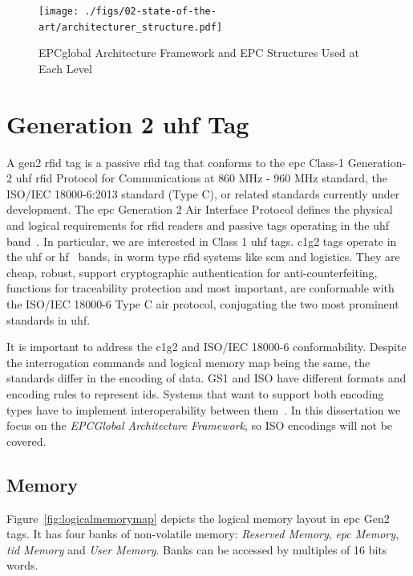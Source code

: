 \begin{figure}[!ht]
    \centering
    \texttt{[image: ./figs/02-state-of-the-art/architecturer\_structure.pdf]}
    \caption{EPCglobal Architecture Framework and EPC Structures Used at Each Level~\cite{GS1EPCTDS}} 
    \label{fig:archstructure}
\end{figure}

\section{Generation 2 \ac{uhf} Tag}

A \ac{gen2} \ac{rfid} tag is a passive \ac{rfid} tag that conforms to the \ac{epc} Class-1 Generation-2 \ac{uhf} \ac{rfid} Protocol for Communications at $860$ MHz - $960$ MHz standard, the ISO/IEC 18000-6:2013 standard (Type C), or related standards currently under development.
The \ac{epc} Generation 2 Air Interface Protocol defines the physical and logical requirements for \ac{rfid} readers and passive tags operating in the \ac{uhf} band~\cite{Gs1epcgen2v2uhfairinterfaceI2120180904}.
In particular, we are interested in Class 1 \ac{uhf} tags. \ac{c1g2} tags operate in the \ac{uhf} or \ac{hf}~\cite{EpcglobalHf3standard20110905r3} bands, in \ac{worm} type \ac{rfid} systems like \ac{scm} and logistics.
They are cheap, robust, support cryptographic authentication for anti-counterfeiting, functions for traceability protection and most important, are conformable with the ISO/IEC 18000-6 Type C air protocol, conjugating the two most prominent standards in \ac{uhf}.

It is important to address the \ac{c1g2} and ISO/IEC 18000-6 conformability. Despite the interrogation commands and logical memory map being the same, the standards differ in the encoding of data. 
GS1 and ISO have different formats and encoding rules to represent \acp{id}.
Systems that want to support both encoding types have to implement interoperability between them~\cite{mizutaniMulticodePortableRFID2016a}.
In this dissertation we focus on the \emph{EPCGlobal Architecture Framework}, so ISO encodings will not be covered.

\subsection{Memory}

Figure~\ref{fig:logicalmemorymap} depicts the logical memory layout in \ac{epc} Gen2 tags. It has four banks of non-volatile memory: \emph{Reserved Memory}, \emph{\ac{epc} Memory}, \emph{\ac{tid} Memory} and \emph{User Memory}. Banks can be accessed by multiples of 16 bits words.

